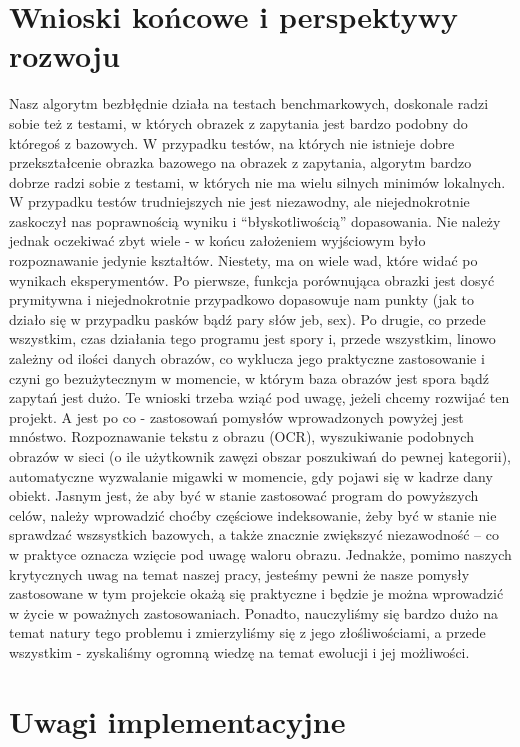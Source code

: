 \documentclass[a4paper,12pt,leqno]{article}
\begin{document}
\section{Wnioski końcowe i perspektywy rozwoju}
Nasz algorytm bezbłędnie działa na testach benchmarkowych, doskonale radzi sobie też z testami, w których obrazek z zapytania jest bardzo podobny do któregoś z bazowych.
W przypadku testów, na których nie istnieje dobre przekształcenie obrazka bazowego na obrazek z zapytania, algorytm bardzo dobrze radzi sobie z testami, 
w których nie ma wielu silnych minimów lokalnych. W przypadku testów trudniejszych nie jest niezawodny, ale niejednokrotnie zaskoczył nas poprawnością wyniku i ``błyskotliwością'' dopasowania.
Nie należy jednak oczekiwać zbyt wiele - w końcu założeniem wyjściowym było rozpoznawanie jedynie kształtów.
Niestety, ma on wiele wad, które widać po wynikach eksperymentów. Po pierwsze, funkcja porównująca obrazki jest dosyć prymitywna i niejednokrotnie przypadkowo dopasowuje nam punkty 
(jak to działo się w przypadku pasków bądź pary słów jeb, sex).
Po drugie, co przede wszystkim, czas działania tego programu jest spory i, przede wszystkim, linowo zależny od ilości danych obrazów, 
co wyklucza jego praktyczne zastosowanie i czyni go bezużytecznym w momencie, w którym baza obrazów jest spora bądź zapytań jest dużo.
Te wnioski trzeba wziąć pod uwagę, jeżeli chcemy rozwijać ten projekt. A jest po co - zastosowań pomysłów wprowadzonych powyżej jest mnóstwo.
Rozpoznawanie tekstu z obrazu (OCR), wyszukiwanie podobnych obrazów w sieci (o ile użytkownik zawęzi obszar poszukiwań do pewnej kategorii), automatyczne wyzwalanie migawki w momencie, 
gdy pojawi się w kadrze dany obiekt.
Jasnym jest, że aby być w stanie zastosować program do powyższych celów, należy wprowadzić choćby częściowe indeksowanie, żeby być w stanie nie sprawdzać wszsystkich bazowych, 
a także znacznie zwiększyć niezawodność -- co w praktyce oznacza wzięcie pod uwagę waloru obrazu. 
Jednakże, pomimo naszych krytycznych uwag na temat naszej pracy, jesteśmy pewni że nasze pomysły zastosowane w tym projekcie okażą się praktyczne i będzie je można wprowadzić w życie
w poważnych zastosowaniach. Ponadto, nauczyliśmy się bardzo dużo na temat natury tego problemu i zmierzyliśmy się z jego złośliwościami, a przede wszystkim - zyskaliśmy ogromną wiedzę na temat
ewolucji i jej możliwości.

\section{Uwagi implementacyjne}
\end{document}
